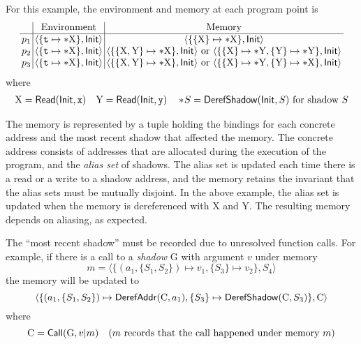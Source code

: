 \documentclass{article}
\begin{document}
For this example, the environment and memory at each program point is
\[
  \setlength{\arraycolsep}{2pt}
  \begin{array}{c|c|c}
              & \text{Environment}                                  & \text{Memory}                                                                                                                                               \\
    \hline
    \ppoint_1 & \langle\{\texttt{t}\mapsto*\text{X}\},\InitE\rangle & \langle\{\{\text{X}\}\mapsto*\text{X}\},\InitE\rangle                                                                                                       \\
    \ppoint_2 & \langle\{\texttt{t}\mapsto*\text{X}\},\InitE\rangle & \langle\{\{\text{X},\text{Y}\}\mapsto*\text{X}\},\InitE\rangle\text{ or }\langle\{\{\text{X}\}\mapsto*\text{Y},\{\text{Y}\}\mapsto*\text{Y}\},\InitE\rangle \\
    \ppoint_3 & \langle\{\texttt{t}\mapsto*\text{X}\},\InitE\rangle & \langle\{\{\text{X},\text{Y}\}\mapsto*\text{X}\},\InitE\rangle\text{ or }\langle\{\{\text{X}\}\mapsto*\text{Y},\{\text{Y}\}\mapsto*\text{X}\},\InitE\rangle
  \end{array}
\]
where
\begin{align*}
  \text{X}=\mathsf{Read}(\mathsf{Init},\texttt{x})\quad\text{Y}=\mathsf{Read}(\mathsf{Init},\texttt{y})\quad*\!S=\mathsf{DerefShadow}(\mathsf{Init},S)\text{ for shadow }S
\end{align*}

The memory is represented by a tuple holding the bindings for each concrete address
and the most recent shadow that affected the memory.
The concrete address consists of addresses that are allocated during the execution
of the program, and the \emph{alias set} of shadows.
The alias set is updated each time there is a read or a write to a shadow address,
and the memory retains the invariant that the alias sets must be mutually disjoint.
In the above example, the alias set is updated when the memory is dereferenced with
X and Y. The resulting memory depends on aliasing, as expected.

The ``most recent shadow'' must be recorded due to unresolved function calls.
For example, if there is a call to a \emph{shadow} G with argument $v$ under memory
\[m=\langle\{(a_1,\{S_1,S_2\})\mapsto v_1,\{S_3\}\mapsto v_2\},S_4\rangle\]
the memory will be updated to
\[\langle\{(a_1,\{S_1,S_2\})\mapsto\mathsf{DerefAddr}(\text{C},a_1),\{S_3\}\mapsto\mathsf{DerefShadow}(\text{C},S_3)\},\text{C}\rangle\]
where
\[\text{C}=\mathsf{Call}(\text{G},v|m)\quad(m\text{ records that the call happened under memory }m)\]
\end{document}
